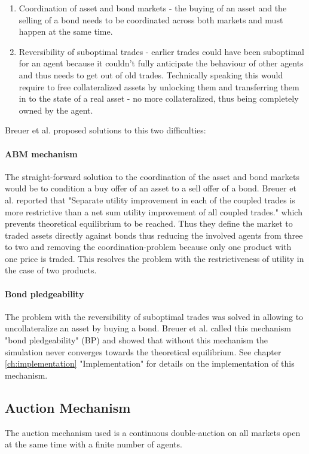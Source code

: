 \documentclass[../Bachelorarbeit.tex]{subfiles}
\begin{document}
\begin{enumerate}
\item Coordination of asset and bond markets - the buying of an asset and the selling of a bond needs to be coordinated across both markets and must happen at the same time.
\item Reversibility of suboptimal trades - earlier trades could have been suboptimal for an agent because it couldn't fully anticipate the behaviour of other agents and thus needs to get out of old trades. Technically speaking this would require to free collateralized assets by unlocking them and transferring them in to the state of a real asset - no more collateralized, thus being completely owned by the agent.
\end{enumerate}

Breuer et al. proposed solutions to this two difficulties:
\paragraph{ABM mechanism}
The straight-forward solution to the coordination of the asset and bond markets would be to condition a buy offer of an asset to a sell offer of a bond. Breuer et al. reported that "Separate utility improvement in each of the coupled trades is more restrictive than a net sum utility improvement of all coupled trades." which prevents theoretical equilibrium to be reached. Thus they define the market to traded assets directly against bonds thus reducing the involved agents from three to two and removing the coordination-problem because only one product with one price is traded. This resolves the problem with the restrictiveness of utility in the case of two products.

\paragraph{Bond pledgeability}
The problem with the reversibility of suboptimal trades was solved in allowing to uncollateralize an asset by buying a bond. Breuer et al. called this mechanism "bond pledgeability" (BP) and showed that without this mechanism the simulation never converges towards the theoretical equilibrium. See chapter \ref{ch:implementation} "Implementation" for details on the implementation of this mechanism.

\subsection{Auction Mechanism}
The auction mechanism used is a continuous double-auction on all markets open at the same time with a finite number of agents.
\end{document}
